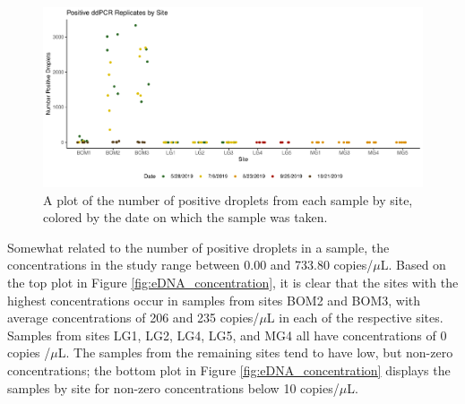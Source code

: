 \documentclass[12pt]{article}\usepackage[]{graphicx}\usepackage[]{color}
\makeatletter
\def\maxwidth{ %
  \ifdim\Gin@nat@width>\linewidth
    \linewidth
  \else
    \Gin@nat@width
  \fi
}
\newenvironment{knitrout}{}{} %
\def\maxwidth{ %
  \ifdim\Gin@nat@width>\linewidth
    \linewidth
  \else
    \Gin@nat@width
  \fi
}
\newenvironment{knitrout}{}{} %
\makeatother
\begin{document}
\begin{figure}[]
\begin{knitrout}
\color{fgcolor}

{\centering \includegraphics[width=\maxwidth]{figure/eDNA_visualization_droplets-1} 

}



\end{knitrout}
\caption{A plot of the number of positive droplets from each sample by site, colored by the date on which the sample was taken.}
\label{fig:eDNA_droplets}
\end{figure}

Somewhat related to the number of positive droplets in a sample, the concentrations in the study range between 0.00 and 733.80 copies/$\mu$L. Based on the top plot in Figure \ref{fig:eDNA_concentration}, it is clear that the sites with the highest concentrations occur in samples from sites BOM2 and BOM3, with average concentrations of 206 and 235 copies/$\mu$L in each of the respective sites. Samples from sites LG1, LG2, LG4, LG5, and MG4 all have concentrations of 0 copies /$\mu$L. The samples from the remaining sites tend to have low, but non-zero concentrations; the bottom plot in Figure \ref{fig:eDNA_concentration} displays the samples by site for non-zero concentrations below 10 copies/$\mu$L.
\end{document}
